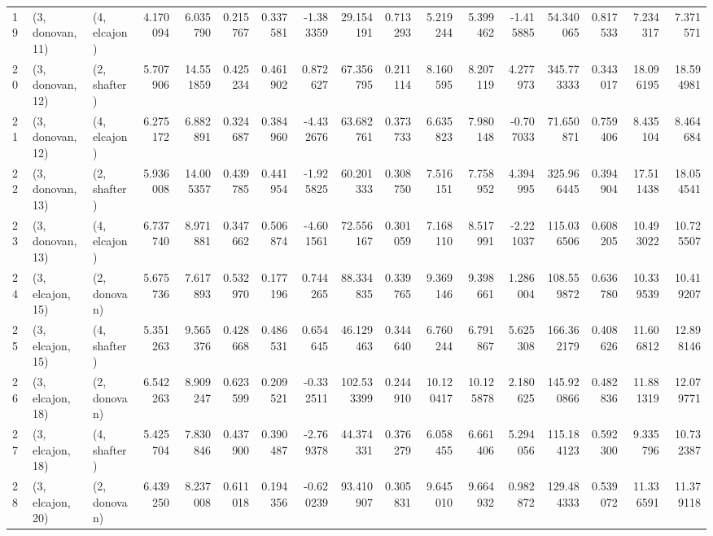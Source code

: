 \begin{tabular}{lllrrrrrrrrrrrrrr}
19 &  (3, donovan, 11) &     (4, elcajon) &   4.170094 &   6.035790 &   0.215767 &  0.337581 & -1.383359 &    29.154191 &   0.713293 &   5.219244 &   5.399462 &  -1.415885 &   54.340065 &  0.817533 &   7.234317 &   7.371571 \\
20 &  (3, donovan, 12) &     (2, shafter) &   5.707906 &  14.551859 &   0.425234 &  0.461902 &  0.872627 &    67.356795 &   0.211114 &   8.160595 &   8.207119 &   4.277973 &  345.773333 &  0.343017 &  18.096195 &  18.594981 \\
21 &  (3, donovan, 12) &     (4, elcajon) &   6.275172 &   6.882891 &   0.324687 &  0.384960 & -4.432676 &    63.682761 &   0.373733 &   6.635823 &   7.980148 &  -0.707033 &   71.650871 &  0.759406 &   8.435104 &   8.464684 \\
22 &  (3, donovan, 13) &     (2, shafter) &   5.936008 &  14.005357 &   0.439785 &  0.441954 & -1.925825 &    60.201333 &   0.308750 &   7.516151 &   7.758952 &   4.394995 &  325.966445 &  0.394904 &  17.511438 &  18.054541 \\
23 &  (3, donovan, 13) &     (4, elcajon) &   6.737740 &   8.971881 &   0.347662 &  0.506874 & -4.601561 &    72.556167 &   0.301059 &   7.168110 &   8.517991 &  -2.221037 &  115.036506 &  0.608205 &  10.493022 &  10.725507 \\
24 &  (3, elcajon, 15) &     (2, donovan) &   5.675736 &   7.617893 &   0.532970 &  0.177196 &  0.744265 &    88.334835 &   0.339765 &   9.369146 &   9.398661 &   1.286004 &  108.559872 &  0.636780 &  10.339539 &  10.419207 \\
25 &  (3, elcajon, 15) &     (4, shafter) &   5.351263 &   9.565376 &   0.428668 &  0.486531 &  0.654645 &    46.129463 &   0.344640 &   6.760244 &   6.791867 &   5.625308 &  166.362179 &  0.408626 &  11.606812 &  12.898146 \\
26 &  (3, elcajon, 18) &     (2, donovan) &   6.542263 &   8.909247 &   0.623599 &  0.209521 & -0.332511 &   102.533399 &   0.244910 &  10.120417 &  10.125878 &   2.180625 &  145.920866 &  0.482836 &  11.881319 &  12.079771 \\
27 &  (3, elcajon, 18) &     (4, shafter) &   5.425704 &   7.830846 &   0.437900 &  0.390487 & -2.769378 &    44.374331 &   0.376279 &   6.058455 &   6.661406 &   5.294056 &  115.184123 &  0.592300 &   9.335796 &  10.732387 \\
28 &  (3, elcajon, 20) &     (2, donovan) &   6.439250 &   8.237008 &   0.611018 &  0.194356 & -0.620239 &    93.410907 &   0.305831 &   9.645010 &   9.664932 &   0.982872 &  129.484333 &  0.539072 &  11.336591 &  11.379118 \\

\end{tabular}
